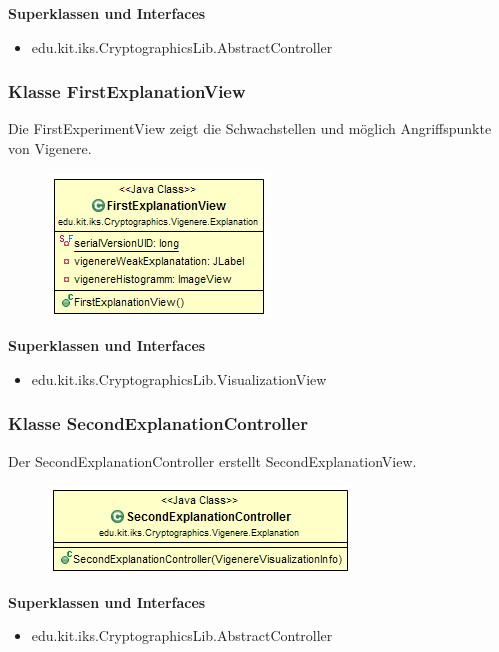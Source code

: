 \documentclass{article}
\begin{document}
      \textbf{Superklassen und Interfaces}
      \begin{itemize}
        \item edu.kit.iks.CryptographicsLib.AbstractController
      \end{itemize}

    \subsubsection{Klasse FirstExplanationView}
      Die FirstExperimentView zeigt die Schwachstellen und möglich Angriffspunkte von Vigenere.
      \begin{figure}[H]
        \centering
        \includegraphics{resources/edu-kit-iks-Cryptographics-Vigenere-FirstExplanationView}
      \end{figure}

      \textbf{Superklassen und Interfaces}
      \begin{itemize}
        \item edu.kit.iks.CryptographicsLib.VisualizationView
      \end{itemize}

    \subsubsection{Klasse SecondExplanationController}
      Der SecondExplanationController erstellt SecondExplanationView.
      \begin{figure}[H]
        \centering
        \includegraphics{resources/edu-kit-iks-Cryptographics-Vigenere-SecondExplanationController}
      \end{figure}

      \textbf{Superklassen und Interfaces}
      \begin{itemize}
        \item edu.kit.iks.CryptographicsLib.AbstractController
      \end{itemize}
\end{document}
